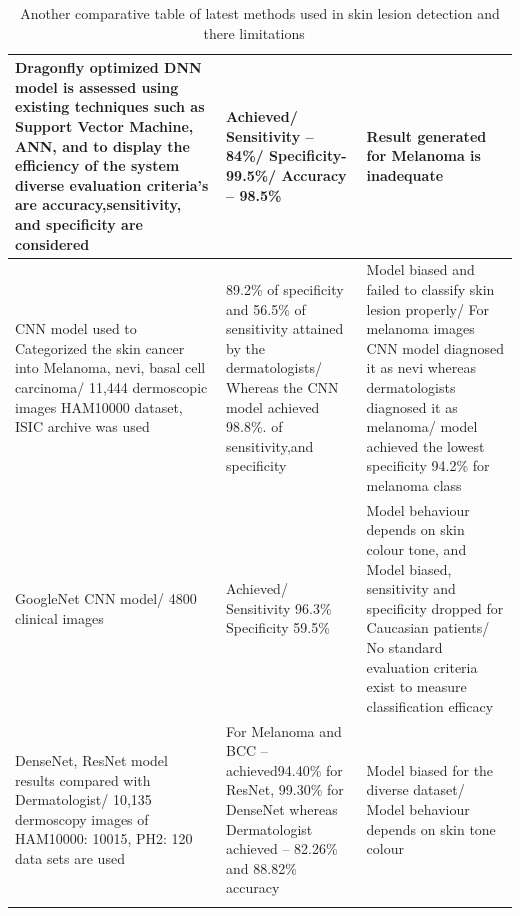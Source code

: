 \begin{longtable}{p{4cm}|p{4cm}|p{6cm}}
        \hline
        Dragonfly optimized DNN model is assessed using existing techniques such as Support Vector Machine, ANN, and to display the efficiency of the system diverse evaluation criteria’s are accuracy,sensitivity, and specificity are considered & Achieved/ Sensitivity – 84\%/ Specificity- 99.5\%/ Accuracy – 98.5\% & Result generated for Melanoma is inadequate\\
        \hline
        CNN model used to Categorized the skin cancer into Melanoma, nevi, basal cell carcinoma/ 11,444 dermoscopic images HAM10000 dataset, ISIC archive was used & 89.2\% of specificity and 56.5\% of sensitivity attained by the dermatologists/ Whereas the CNN model achieved 98.8\%. of sensitivity,and specificity & Model biased and failed to classify skin lesion properly/ For melanoma images CNN model diagnosed it as nevi whereas dermatologists diagnosed it as melanoma/ model achieved the lowest specificity 94.2\% for melanoma class\\
        \hline
        GoogleNet CNN model/ 4800 clinical images & Achieved/ Sensitivity 96.3\% Specificity 59.5\% & Model behaviour depends on skin colour tone, and Model biased, sensitivity and specificity dropped for Caucasian patients/ No standard evaluation criteria exist to measure classification efficacy\\
        \hline
        DenseNet, ResNet model results compared with Dermatologist/ 10,135 dermoscopy images of HAM10000: 10015, PH2: 120 data sets are used & For Melanoma and BCC – achieved94.40\% for ResNet, 99.30\% for DenseNet whereas Dermatologist achieved – 82.26\% and 88.82\% accuracy & Model biased for the diverse dataset/ Model behaviour depends on skin tone colour\\
        \hline
        \caption{Another comparative table of latest methods used in skin lesion detection and there limitations ~\cite{Naresh2020}}
        \label{tab:second}
    \end{longtable} 
 
